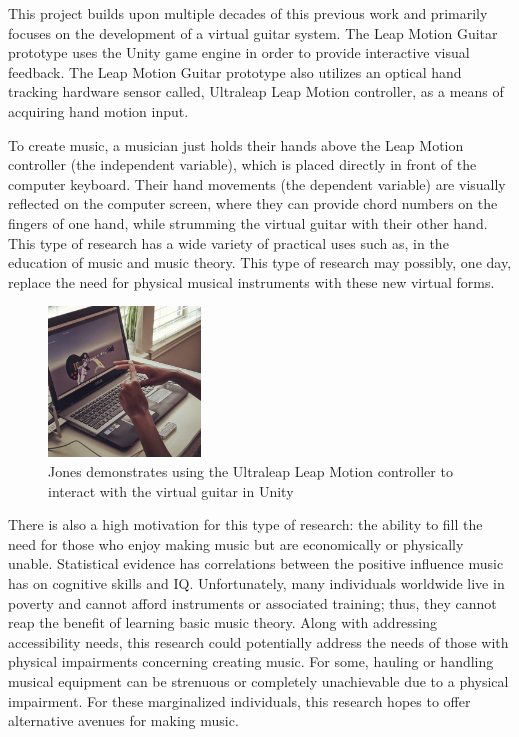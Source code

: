 \documentclass{vgtc}                          %
\begin{document}
This project builds upon multiple decades of this previous work and primarily focuses on the development of a virtual guitar system. The Leap Motion Guitar prototype uses the Unity game engine in order to provide interactive visual feedback. The Leap Motion Guitar prototype also utilizes an optical hand tracking hardware sensor called, Ultraleap Leap Motion controller, as a means of acquiring hand motion input. 

To create music, a musician just holds their hands above the Leap Motion controller (the independent variable), which is placed directly in front of the computer keyboard. Their hand movements (the dependent variable) are visually reflected on the computer screen, where they can provide chord numbers on the fingers of one hand, while strumming the virtual guitar with their other hand. This type of research has a wide variety of practical uses such as, in the education of music and music theory. This type of research may possibly, one day, replace the need for physical musical instruments with these new virtual forms.

\begin{figure}[h]
\centering
\includegraphics[height=4cm]{pictures/Leap_Motion_Guitar_Jones.png}
\centering
\caption{ Jones demonstrates using the Ultraleap Leap
Motion controller to interact with the virtual guitar in Unity}
\end{figure}

There is also a high motivation for this type of research: the ability to fill the need for those who enjoy making music but are economically or physically unable. Statistical evidence has correlations between the positive influence music has on cognitive skills and IQ. Unfortunately, many individuals worldwide live in poverty and cannot afford instruments or associated training; thus, they cannot reap the benefit of learning basic music theory. Along with addressing accessibility needs, this research could potentially address the needs of those with physical impairments concerning creating music. For some, hauling or handling musical equipment can be strenuous or completely unachievable due to a physical impairment. For these marginalized individuals, this research hopes to offer alternative avenues for making music.
\end{document}
